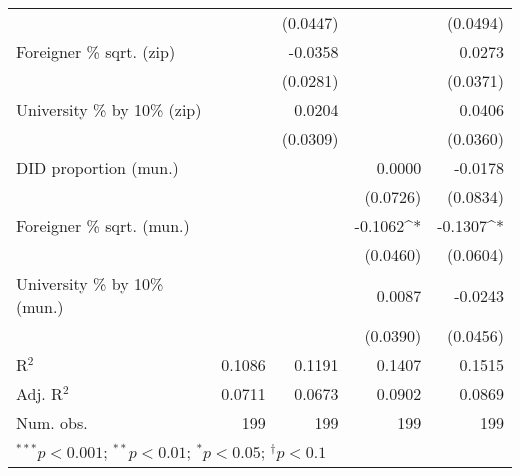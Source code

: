 \begin{tabular}{l D{.}{.}{3.7} D{.}{.}{3.7} D{.}{.}{3.7} D{.}{.}{3.7}}
                                  &               & (0.0447)      &               & (0.0494)      \\
Foreigner \% sqrt. (zip)          &               & -0.0358       &               & 0.0273        \\
                                  &               & (0.0281)      &               & (0.0371)      \\
University \% by 10\% (zip)       &               & 0.0204        &               & 0.0406        \\
                                  &               & (0.0309)      &               & (0.0360)      \\
DID proportion (mun.)             &               &               & 0.0000        & -0.0178       \\
                                  &               &               & (0.0726)      & (0.0834)      \\
Foreigner \% sqrt. (mun.)         &               &               & -0.1062^{*}   & -0.1307^{*}   \\
                                  &               &               & (0.0460)      & (0.0604)      \\
University \% by 10\% (mun.)      &               &               & 0.0087        & -0.0243       \\
                                  &               &               & (0.0390)      & (0.0456)      \\
\midrule
R$^2$                             & 0.1086        & 0.1191        & 0.1407        & 0.1515        \\
Adj. R$^2$                        & 0.0711        & 0.0673        & 0.0902        & 0.0869        \\
Num. obs.                         & 199           & 199           & 199           & 199           \\
\bottomrule
{}
\end{tabular}
